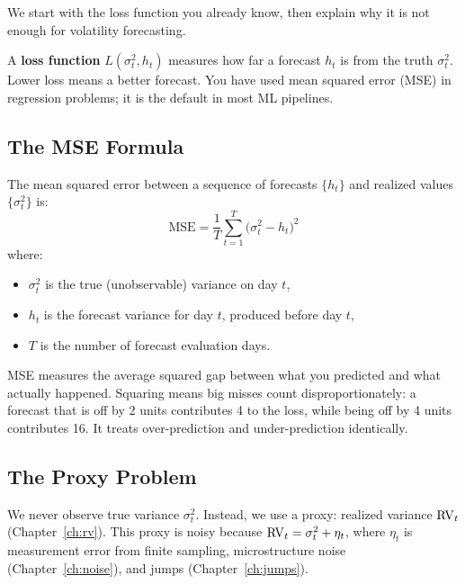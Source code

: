 We start with the loss function you already know, then explain why it is not enough for volatility forecasting.

\begin{prereq}
A \textbf{loss function} $L(\sigma^2_t, h_t)$ measures how far a forecast $h_t$ is from the truth $\sigma^2_t$.
Lower loss means a better forecast.
You have used mean squared error (MSE) in regression problems; it is the default in most ML pipelines.
\end{prereq}

\subsection{The MSE Formula}

The mean squared error between a sequence of forecasts $\{h_t\}$ and realized values $\{\sigma^2_t\}$ is:
\begin{equation}
\label{eq:mse}
\text{MSE} = \frac{1}{T}\sum_{t=1}^{T} \bigl(\sigma^2_t - h_t\bigr)^2
\end{equation}
where:
\begin{itemize}[nosep]
  \item $\sigma^2_t$ is the true (unobservable) variance on day $t$,
  \item $h_t$ is the forecast variance for day $t$, produced before day $t$,
  \item $T$ is the number of forecast evaluation days.
\end{itemize}

\begin{intuition}
MSE measures the average squared gap between what you predicted and what actually happened.
Squaring means big misses count disproportionately: a forecast that is off by 2 units contributes 4 to the loss, while being off by 4 units contributes 16.
It treats over-prediction and under-prediction identically.
\end{intuition}

\subsection{The Proxy Problem}

We never observe true variance $\sigma^2_t$.
Instead, we use a proxy: realized variance $\operatorname{RV}_t$ (Chapter~\ref{ch:rv}).
This proxy is noisy because $\operatorname{RV}_t = \sigma^2_t + \eta_t$, where $\eta_t$ is measurement error from finite sampling, microstructure noise (Chapter~\ref{ch:noise}), and jumps (Chapter~\ref{ch:jumps}).

